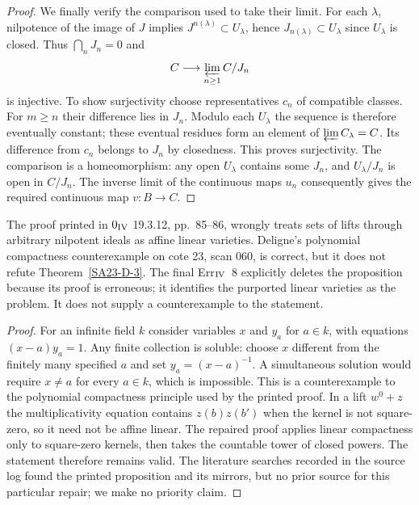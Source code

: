 \begin{proof}
We finally verify the comparison used to take their limit.  For
each $\lambda$, nilpotence of the image of $J$ implies
$J^{n(\lambda)}\subset U_\lambda$, hence
$J_{n(\lambda)}\subset U_\lambda$ since $U_\lambda$ is closed.
Thus $\bigcap_nJ_n=0$ and
\[
 C\longrightarrow\varprojlim_{n\geq1}C/J_n
\]
is injective.  To show surjectivity choose representatives $c_n$
of compatible classes.  For $m\geq n$ their difference lies in
$J_n$.  Modulo each $U_\lambda$ the sequence is therefore
eventually constant; these eventual residues form an element of
$\varprojlim C_\lambda=C$.  Its difference from $c_n$ belongs
to $J_n$ by closedness.  This proves surjectivity.  The comparison
is a homeomorphism: any open $U_\lambda$ contains some $J_n$,
and $U_\lambda/J_n$ is open in $C/J_n$.  The inverse limit of
the continuous maps $u_n$ consequently gives the required
continuous map $v:B\to C$.
\end{proof}

\begin{proposition}\label{SA23-D-4}
The proof printed in $0_{\rm IV}$ 19.3.12, pp.~85--86, wrongly
treats sets of lifts through arbitrary nilpotent ideals as affine
linear varieties.  Deligne's polynomial compactness counterexample
on cote 23, scan 060, is correct, but it does not refute
Theorem~\ref{SA23-D-3}.
The final Err$_{\rm IV}$~8 explicitly deletes the proposition
because its proof is erroneous; it identifies the purported
linear varieties as the problem.  It does not supply a
counterexample to the statement.
\cite[Err$_{\rm IV}$~8, p.~347]{algEGAIV4}
\end{proposition}
\begin{proof}
For an infinite field $k$ consider variables $x$ and $y_a$ for
$a\in k$, with equations $(x-a)y_a=1$.  Any finite collection is
soluble: choose $x$ different from the finitely many specified
$a$ and set $y_a=(x-a)^{-1}$.  A simultaneous solution would
require $x\ne a$ for every $a\in k$, which is impossible.
This is a counterexample to the polynomial compactness principle
used by the printed proof.  In a lift $w^0+z$ the multiplicativity
equation contains $z(b)z(b')$ when the kernel is not square-zero,
so it need not be affine linear.  The repaired proof applies linear
compactness only to square-zero kernels, then takes the countable
tower of closed powers.  The statement therefore remains valid.
The literature searches recorded in the source log found the printed
proposition and its mirrors, but no prior source for this particular
repair; we make no priority claim.
\end{proof}

